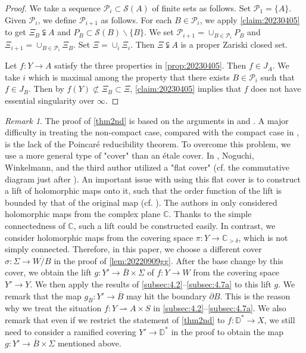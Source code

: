 \documentclass[11pt,english]{smfart}
\theoremstyle{plain}
\theoremstyle{definition}
\theoremstyle{remark}
\newtheorem{rem}[thm]{Remark}
\numberwithin{equation}{section}
\theoremstyle{plain}
\newcommand{\da}{\rightharpoonup}
\newcommand{\bC}{\mathbb{C}}
\begin{document}
\begin{proof}
		
		
		
		We take a sequence $\mathcal{P}_i\subset \mathcal{S}(A)$ of finite sets as follows.
		Set $\mathcal{P}_1=\{A\}$.
		Given $\mathcal{P}_i$, we define $\mathcal{P}_{i+1}$ as follows.
		For each $B\in\mathcal{P}_i$, we apply \cref{claim:20230405} to get $\Xi_B\subsetneqq A$ and $P_B\subset \mathcal{S}(B)\backslash\{B\}$.
		We set $\mathcal{P}_{i+1}=\cup_{B\in \mathcal{P}_i}P_B$ and $\Xi_{i+1}=\cup_{B\in\mathcal{P}_i}\Xi_B$.
		Set $\Xi=\cup_i\Xi_i$.
		Then $\Xi\subsetneqq A$ is a proper Zariski closed set.
		
		Let $f:Y\to A$ satisfy the three properties in \cref{prop:20230405}.
		Then $f\in J_A$.
		We take $i$ which is maximal among the property that there exists $B\in \mathcal{P}_i$ such that $f\in J_B$. 	
		Then by $f(Y)\not\subset \Xi_B\subset \Xi$,
		\cref{claim:20230405} implies that $f$ does not have essential singularity over $\infty$.
	\end{proof}
	
	
	
	\begin{rem}\label{rem:20250904}
	The proof of \cref{thm2nd} is based on the arguments in \cite{Yam15} and \cite{NWY13}.
A major difficulty in treating the non-compact case, compared with the compact case in \cite{Yam15}, is the lack of the Poincar{\'e} reducibility theorem.
To overcome this problem, we use a more general type of "cover" than an {\'e}tale cover.
In \cite{NWY08}, Noguchi, Winkelmann, and the third author utilized a "flat cover" (cf. the commutative diagram just after \cite[(5.9)]{NWY08}).
An important issue with using this flat cover is to construct a lift of holomorphic maps onto it, such that the order function of the lift is bounded by that of the original map (cf. \cite[Lemma 5.8]{NWY08}).
The authors in \cite{NWY08} only considered holomorphic maps from the complex plane $\mathbb C$. Thanks to the simple connectedness of $\mathbb C$, such a lift could be constructed easily.
In contrast, we consider holomorphic maps from the covering space $\pi:Y\to \bC_{>\delta}$, which is not simply connected.
Therefore, in this paper, we choose a different cover $\sigma:\Sigma\to \overline{W/B}$ in the proof of \cref{lem:20220909gg}.
After the base change by this cover, we obtain the lift $g:Y'\to \overline{B}\times \Sigma$ of $f:Y\to W$ from the covering space $Y'\to Y$.
We then apply the results of \cref{subsec:4.2}--\cref{subsec:4.7a} to this lift $g$.
We remark that the map $g_{\overline{B}}:Y'\to \overline{B}$ may hit the boundary $\partial B$. This is the reason why we treat the situation $f:Y\da A\times S$ in \cref{subsec:4.2}--\cref{subsec:4.7a}.
We also remark that even if we restrict the statement of \cref{thm2nd} to $f:\mathbb D^*\to X$, we still need to consider a ramified covering $Y'\to \mathbb D^*$ in the proof to obtain the map $g:Y'\to \overline{B}\times \Sigma$ mentioned above.
	\end{rem}
	
\end{document}
